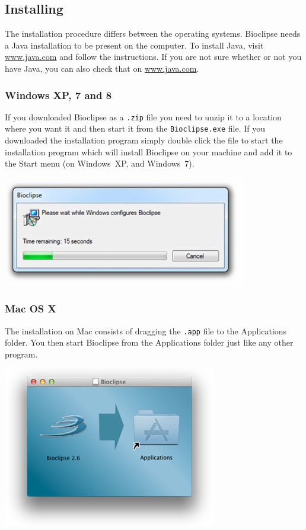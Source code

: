 \documentclass[a5paper, 10pt]{memoir}
\begin{document}
\begin{refsection}
\subsection{Installing}
The installation procedure differs between the operating systems. Bioclipse
needs a Java installation to be present on the computer. To install Java, visit
\url{www.java.com} and follow the instructions. If you are not sure whether or
not you have Java, you can also check that on \url{www.java.com}.

\subsubsection{Windows XP, 7 and 8}
If you downloaded Bioclipse as a \texttt{.zip} file you need to unzip it to a
location where you want it and then start it from the \texttt{Bioclipse.exe}
file. If you downloaded the installation program simply double click the file
to start the installation program which will install Bioclipse on your machine
and add it to the Start menu (on Windows~XP, and Windows~7).
\begin{center}
\includegraphics[width=0.8\textwidth]{images/WindowsInstaller.png}
\end{center}
\subsubsection{Mac OS X}
The installation on Mac consists of dragging the \texttt{.app} file to the
Applications folder. You then start Bioclipse from the Applications folder just
like any other program. 
\begin{center}
\includegraphics[width=0.7\textwidth]{images/MacInstaller.png}
\end{center}

\end{refsection}
\end{document}

